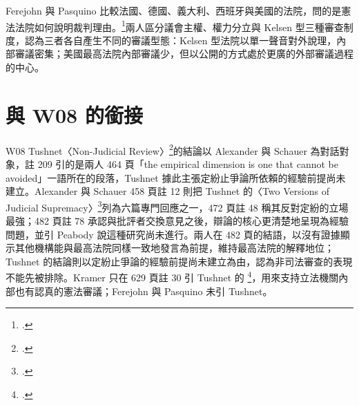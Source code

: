 Ferejohn 與 Pasquino 比較法國、德國、義大利、西班牙與美國的法院，問的是憲法法院如何說明裁判理由。\footcite{ferejohn2002}兩人區分議會主權、權力分立與 Kelsen 型三種審查制度，認為三者各自產生不同的審議型態：Kelsen 型法院以單一聲音對外說理，內部審議密集；美國最高法院內部審議少，但以公開的方式處於更廣的外部審議過程的中心。

\section{與 W08 的銜接}
\label{sec:intro-3}

W08 Tushnet〈Non-Judicial Review〉\footcite[註 209]{tushnet2003}的結論以 Alexander 與 Schauer 為對話對象，註 209 引的是兩人 464 頁「the empirical dimension is one that cannot be avoided」一語所在的段落，Tushnet 據此主張定紛止爭論所依賴的經驗前提尚未建立。Alexander 與 Schauer 458 頁註 12 則把 Tushnet 的〈Two Versions of Judicial Supremacy〉\footcite{tushnet1998}列為六篇專門回應之一，472 頁註 48 稱其反對定紛的立場最強；482 頁註 78 承認與批評者交換意見之後，辯論的核心更清楚地呈現為經驗問題，並引 Peabody 說這種研究尚未進行。兩人在 482 頁的結語，以沒有證據顯示其他機構能與最高法院同樣一致地發言為前提，維持最高法院的解釋地位；Tushnet 的結論則以定紛止爭論的經驗前提尚未建立為由，認為非司法審查的表現不能先被排除。Kramer 只在 629 頁註 30 引 Tushnet 的 \footcite{tushnet1999}，用來支持立法機關內部也有認真的憲法審議；Ferejohn 與 Pasquino 未引 Tushnet。
